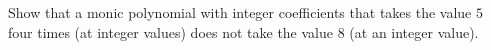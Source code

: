 Show that a monic polynomial with integer coefficients that takes the value $5$ four times (at integer values) does not take the value $8$ (at an integer value).
